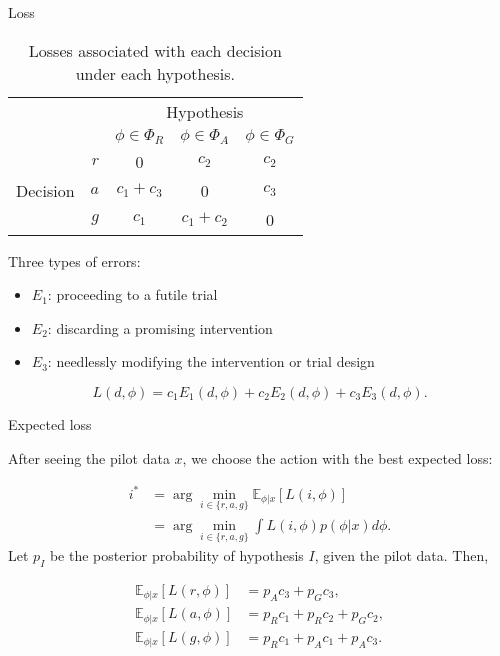 \documentclass[
  ignorenonframetext,
]{beamer}
\providecommand{\tightlist}{%
  \setlength{\itemsep}{0pt}\setlength{\parskip}{0pt}}
\begin{document}
\begin{frame}{Loss}
\protect\hypertarget{loss}{}

\begin{table}
\caption{Losses associated with each decision under each hypothesis.}
\centering
\begin{tabular}{r r c c c}
\toprule
& & \multicolumn{3}{c}{Hypothesis} \\
& & $\phi \in \Phi_{R}$ & $\phi \in \Phi_{A}$ & $\phi \in \Phi_{G}$ \\
\midrule
\multirow{3}{*}{Decision} & $r$ & 0 & $c_{2}$ & $c_{2}$ \\
 & $a$ & $c_{1} + c_{3}$ & 0 & $c_{3}$ \\
 & $g$ & $c_{1}$ & $c_{1} + c_{2}$ & 0  \\
\bottomrule
\end{tabular}
\label{tab:loss}
\end{table}

Three types of errors:

\begin{itemize}
\tightlist
\item
  \(E_1\): proceeding to a futile trial
\item
  \(E_2\): discarding a promising intervention
\item
  \(E_3\): needlessly modifying the intervention or trial design
\end{itemize}

\[
L(d, \phi) = c_1 E_1(d, \phi) + c_2 E_2(d, \phi) + c_3 E_3(d, \phi).
\]

\end{frame}

\begin{frame}{Expected loss}
\protect\hypertarget{expected-loss}{}

After seeing the pilot data \(x\), we choose the action with the best
expected loss:

\[
\begin{align}
i^{*} & = \arg\min_{i \in \{r,a,g\}} \mathbb{E}_{\phi | x} [ L(i, \phi) ] \\
 & = \arg\min_{i \in \{r,a,g\}} \int L(i, \phi) p(\phi | x) d\phi.
\end{align}
\] Let \(p_I\) be the posterior probability of hypothesis \(I\), given
the pilot data. Then,

\[
\begin{aligned}
\mathbb{E}_{\phi | x} [ L(r, \phi) ] & = p_{A}c_{3} + p_{G}c_{3}, \\
\mathbb{E}_{\phi | x} [ L(a, \phi) ] & = p_{R}c_{1} + p_{R}c_{2} + p_{G}c_{2}, \\
\mathbb{E}_{\phi | x} [ L(g, \phi) ] & = p_{R}c_{1} + p_{A}c_{1} + p_{A}c_{3}.
\end{aligned}
\]

\end{frame}
\end{document}

